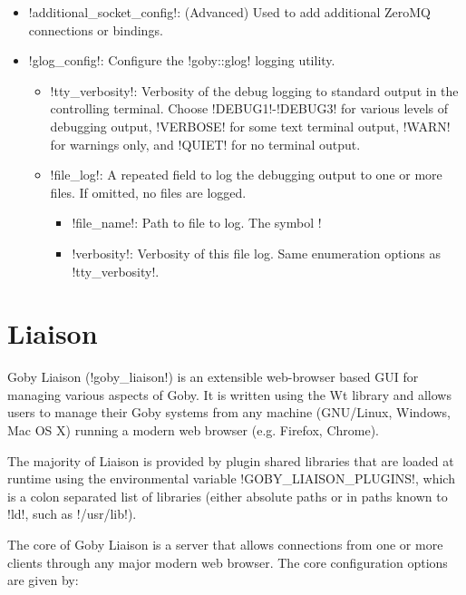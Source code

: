 \begin{itemize}
\begin{itemize}
\begin{itemize}
\end{itemize}
\end{itemize}
\item !additional_socket_config!: (Advanced) Used to add additional ZeroMQ connections or bindings. 
\item !glog_config!: Configure the !goby::glog! logging utility. 
\begin{itemize}
\item !tty_verbosity!: Verbosity of the debug logging to standard output in the controlling terminal. Choose !DEBUG1!-!DEBUG3! for various levels of debugging output, !VERBOSE! for some text terminal output, !WARN! for warnings only, and !QUIET! for no terminal output.
\item !file_log!: A repeated field to log the debugging output to one or more files. If omitted, no files are logged.
\begin{itemize}
\item !file_name!: Path to file to log. The symbol !%
\item !verbosity!: Verbosity of this file log. Same enumeration options as  !tty_verbosity!.
\end{itemize}
\end{itemize}
\end{itemize}

\section{Liaison}\label{sec:liaison}

Goby Liaison (!goby_liaison!) is an extensible web-browser based GUI for managing various aspects of Goby. It is written using the Wt \cite{wt} library and allows users to manage their Goby systems from any machine (GNU/Linux, Windows, Mac OS X) running a modern web browser (e.g. Firefox, Chrome).

The majority of Liaison is provided by plugin shared libraries that are loaded at runtime using the environmental variable !GOBY_LIAISON_PLUGINS!, which is a colon separated list of libraries (either absolute paths or in paths known to !ld!, such as !/usr/lib!).

The core of Goby Liaison is a server that allows connections from one or more clients through any major modern web browser. The core configuration options are given by:

\resetbvlinenumber

